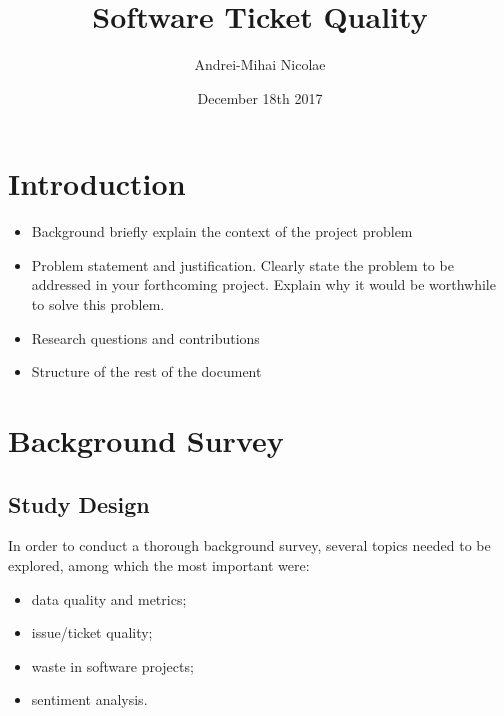 \documentclass{mprop}
\begin{document}
\title{Software Ticket Quality}
\author{Andrei-Mihai Nicolae}
\date{December 18th 2017}
\maketitle

\tableofcontents
\newpage


\section{Introduction}\label{intro}


\begin{itemize}
\item Background briefly explain the context of the project problem
\item Problem statement and justification. Clearly state the problem to be addressed in your forthcoming project.
  Explain why it would be worthwhile to solve this problem.

\item Research questions and contributions
\item Structure of the rest of the document
\end{itemize}



\section{Background Survey}


\subsection{Study Design}

In order to conduct a thorough background survey, several topics needed to be 
explored, among which the most important were:
  \begin{itemize}
    \item data quality and metrics;
    \item issue/ticket quality;
    \item waste in software projects;
    \item sentiment analysis.
  \end{itemize}
\end{document}
